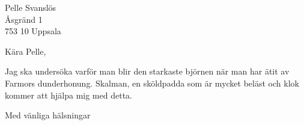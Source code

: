 \documentclass[version=last, scilifelabletter]{scrlttr2}
\begin{document}
%
\begin{letter}{%
		Pelle Svanslös\\
		Åsgränd 1\\ 
		753 10 Uppsala
	}
	\opening{Kära Pelle,}

	Jag ska undersöka varför man blir den starkaste björnen när man har ätit av Farmors dunderhonung. Skalman, en sköldpadda som är mycket beläst och klok kommer att hjälpa mig med detta.
	\closing{Med vänliga hälsningar}
\end{letter}
%
\end{document}
